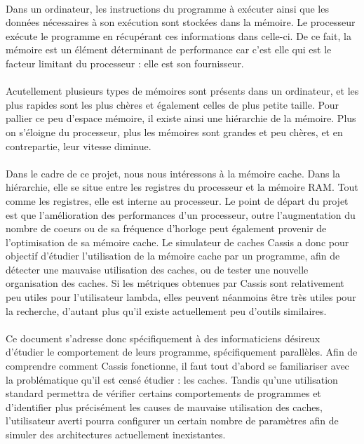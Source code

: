 \paragraph{}
Dans un ordinateur, les instructions du programme à exécuter ainsi que les données nécessaires
à son exécution sont stockées dans la mémoire. Le processeur exécute le programme en récupérant ces informations dans celle-ci. De ce fait, la mémoire est un élément déterminant de performance car c'est elle qui est le facteur limitant du processeur : elle est son fournisseur.

\paragraph{}
Acutellement plusieurs types de mémoires sont présents dans un ordinateur, et les plus rapides sont les plus chères et également celles de plus petite taille.
Pour pallier ce peu d'espace mémoire, il existe ainsi une hiérarchie de la mémoire. Plus on s'éloigne du processeur, plus les mémoires sont grandes et peu chères, et en contrepartie, leur vitesse diminue. 

\paragraph{}
Dans le cadre de ce projet, nous nous intéressons à la mémoire cache. Dans la hiérarchie, elle se situe entre les registres du processeur et la mémoire RAM. Tout comme les registres, elle est interne au processeur.
Le point de départ du projet est que l'amélioration des performances d'un processeur, outre l'augmentation du nombre de coeurs ou de sa fréquence d'horloge peut également provenir de l'optimisation de sa mémoire cache. Le simulateur de caches \textsf{Cassis} a donc pour objectif d'étudier l'utilisation de la mémoire cache par un programme, afin de détecter une mauvaise utilisation des caches, ou de tester une nouvelle organisation des caches. Si les métriques obtenues par \textsf{Cassis} sont relativement peu utiles pour l'utilisateur lambda, elles peuvent néanmoins être très utiles pour la recherche, d'autant plus qu'il existe actuellement peu d'outils similaires.

\paragraph{}
Ce document s'adresse donc spécifiquement à des informaticiens désireux d'étudier le comportement de leurs programme, spécifiquement parallèles. Afin de comprendre comment \textsf{Cassis} fonctionne, il faut tout d'abord se familiariser avec la problématique qu'il est censé étudier : les caches. Tandis qu'une utilisation standard permettra de vérifier certains comportements de programmes et d'identifier plus précisément les causes de mauvaise utilisation des caches, l'utilisateur averti pourra configurer un certain nombre de paramètres afin de simuler des architectures actuellement inexistantes.
